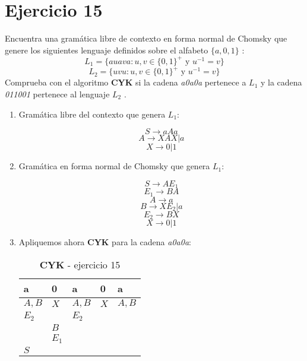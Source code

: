 \documentclass[11pt,a4paper]{article}
\begin{document}
\section*{Ejercicio 15}
Encuentra una gramática libre de contexto en forma normal de Chomsky que genere los siguientes lenguaje definidos sobre el alfabeto $\{a, 0, 1\}$ :
$$L_1 = \{auava : u,v \in \{0, 1\}^+ \text { y } u^{-1} = v\} $$
$$L_2 = \{uvu : u,v \in \{0, 1\}^+ \text{ y } u^{-1} = v\} $$
Comprueba con el algoritmo \textbf{CYK} si la cadena \emph{a0a0a} pertenece a $L_1$ y la cadena \emph{011001} pertenece al lenguaje $L_2$ . \\

\begin{enumerate}
	\item Gramática libre del contexto que genera $L_1$:
		
	$$ S \rightarrow aAa $$
	$$ A \rightarrow XAX | a $$
	$$ X \rightarrow 0|1 $$
		
	\item Gramática en forma normal de Chomsky que genera $L_1$:
	
	$$ S \rightarrow AE_1 $$
	$$ E_1 \rightarrow BA $$
	$$ A \rightarrow a $$
	$$ B \rightarrow XE_2 | a $$
	$$ E_2 \rightarrow BX $$
	$$ X \rightarrow 0|1 $$
	
	\item Apliquemos ahora \textbf{CYK} para la cadena \emph{a0a0a}:
	
	\begin{table}[h]
		\centering
		\caption{\textbf{CYK} - ejercicio 15}
		\label{my-label}
		\begin{tabular}{lllll}
			a                            & 0                          & a                           & 0                        & a                           \\ \hline
			\multicolumn{1}{|l|}{$A, B$} & \multicolumn{1}{l|}{$X$}   & \multicolumn{1}{l|}{$A, B$} & \multicolumn{1}{l|}{$X$} & \multicolumn{1}{l|}{$A, B$} \\ \hline
			\multicolumn{1}{|l|}{$E_2$}  & \multicolumn{1}{l|}{}      & \multicolumn{1}{l|}{$E_2$}  & \multicolumn{1}{l|}{}    &                             \\ \cline{1-4}
			\multicolumn{1}{|l|}{}       & \multicolumn{1}{l|}{$B$}   & \multicolumn{1}{l|}{}       &                          &                             \\ \cline{1-3}
			\multicolumn{1}{|l|}{}       & \multicolumn{1}{l|}{$E_1$} &                             &                          &                             \\ \cline{1-2}
			\multicolumn{1}{|l|}{$S$}    &                            &                             &                          &                             \\ \cline{1-1}
		\end{tabular}
	\end{table}
\end{enumerate}
\end{document}
